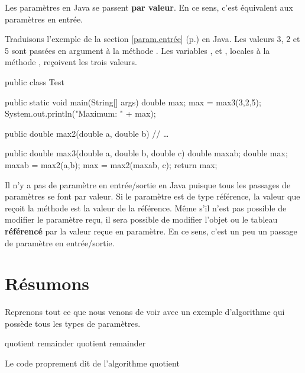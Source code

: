 	Les paramètres en Java se passent \textbf{par valeur}. En ce sens, c'est
	équivalent aux paramètres en entrée. 

	Traduisons l'exemple de la section \ref{param.entrée}
	(p.\pageref{param.entrée}) en Java. Les valeurs 3, 2 et 5 sont passées en
	argument à la méthode . Les variables ,  et ,
	locales à la méthode , reçoivent les trois valeurs. 

	\begin{java}
public class Test{
	public static void main(String[] args){
		double max;
		max = max3(3,2,5);
		System.out.println("Maximum: " + max);
	}

	public double max2(double a, double b){
		// …
	}

	public double max3(double a, double b, double c){
		double maxab;
		double max;
		maxab = max2(a,b);
		max = max2(maxab, c);
		return max;
	}
}
	\end{java}

	Il n'y a pas de paramètre en entrée/sortie en Java puisque tous les passages
	de paramètres se font par valeur. Si le paramètre est de type référence, la
	valeur que reçoit la méthode est la valeur de la référence. Même s'il n'est
	pas possible de modifier le paramètre reçu, il sera possible de modifier
	l'objet ou le tableau \textbf{référencé} par la valeur reçue en paramètre.
	En ce sens, c'est un peu un passage de paramètre en entrée/sortie. 

	
\section{Résumons}

	Reprenons tout ce que nous venons de voir avec un exemple d’algorithme qui
	possède tous les types de paramètres.

	\begin{pseudocode}[1]
			\Write quotient
			\Write remainder
			\Write quotient
			\Write remainder
		\EndAlgo

			\Empty
			\LComment Le code proprement dit de l’algorithme
			\Empty
			\Return quotient
		\EndAlgo
	\end{pseudocode}
	
